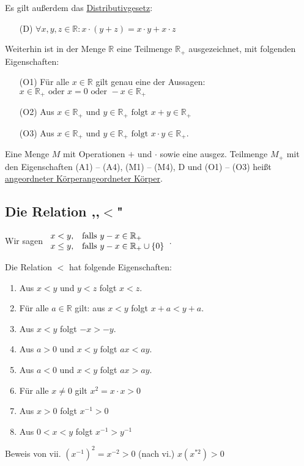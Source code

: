 \documentclass[12pt,a4paper,leqno]{article}
\begin{document}
\begin{description}
\item Es gilt außerdem das \underline{Distributivgesetz}:
\begin{itemize}
\item[(D)] $\forall x, y, z \in \mathbb{R} : x \cdot (y + z) = x \cdot y + x \cdot z$
\end{itemize}

\item Weiterhin ist in der Menge $\mathbb{R}$ eine Teilmenge $\mathbb{R}_+$ ausgezeichnet, mit folgenden Eigenschaften:
\begin{itemize}
\item[(O1)] Für alle $x \in \mathbb{R}$ gilt genau eine der Aussagen: \\ 
$x \in \mathbb{R}_+ \textrm{ oder } x=0  \textrm{ oder } -x \in  \mathbb{R}_+$
\item[(O2)] Aus  $x \in \mathbb{R}_+ \textrm{ und } y \in \mathbb{R}_+ \textrm{ folgt } x + y \in \mathbb{R}_+$
\item[(O3)] Aus $x \in \mathbb{R}_+ \textrm{ und } y \in \mathbb{R}_+ \textrm{ folgt } x \cdot y \in \mathbb{R}_+$.
\end{itemize}

\item[Bem:] Eine Menge $M$ mit Operationen $+$ und $ \cdot $ sowie eine ausgez. Teilmenge $M_+$ mit den Eigenschaften (A1) -- (A4), (M1) -- (M4), D und (O1) -- (O3) heißt \underline{angeordneter Körperangeordneter Körper}. \\

\subsection*{Die Relation ,,$\mathbf{<}$"}
\item[Def:] Wir sagen	
$\begin{array}{l l}
	x < y,		& \textrm{falls } y - x \in \mathbb{R}_+ \\
	x \leq y, 	& \textrm{falls } y - x \in \mathbb{R}_+ \cup \lbrace 0 \rbrace
\end{array}$.

Die Relation $<$ hat folgende Eigenschaften:

\renewcommand{\theenumi}{\roman{enumi}}
\begin{enumerate}
\item Aus $x < y$ und $y < z$ folgt $x < z$.
\item Für alle $a \in \mathbb{R}$ gilt: aus $x < y$ folgt $x + a < y + a$.
\item Aus $x < y$ folgt $-x > -y$.
\item Aus $a > 0$ und $x < y$ folgt $ax < ay$.
\item Aus $a < 0$ und $x < y$ folgt $ax > ay$.
\item Für alle $x \neq 0$ gilt $x^2 = x  \cdot  x > 0$
\item Aus $x > 0$ folgt $x^{-1} > 0$
\item Aus $0 < x < y$ folgt $x^{-1} > y^{-1}$
\end{enumerate}
Beweis von vii. $(x^{-1})^{2}=x^{-2} > 0$ (nach vi.) $ x(x^{*2})>0$

\end{description}
\end{document}

